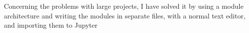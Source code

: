 \documentclass{article}
\begin{document}
    Concerning the problems with large projects, I have solved it by using a
    module architecture and writing the modules in separate files, with a
    normal text editor, and importing them to Jupyter
\end{document}
